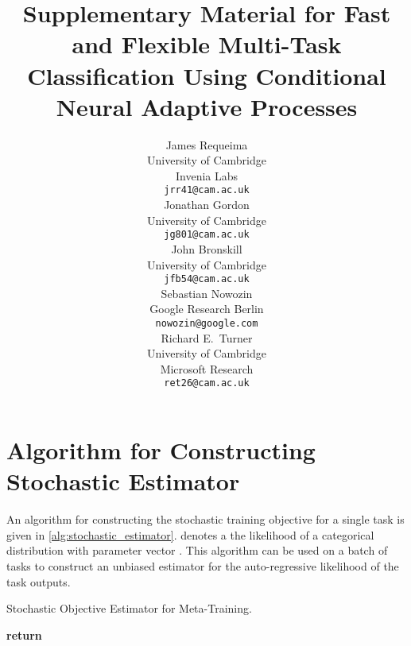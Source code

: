 \documentclass{article}
\theoremstyle{definition}
\begin{document}
\newpage
\appendix
\title{Supplementary Material for Fast and Flexible Multi-Task Classification Using Conditional Neural Adaptive Processes}
\author{
 James Requeima\footnotemark[1] \\
 University of Cambridge \\
 Invenia Labs \\
 \texttt{jrr41@cam.ac.uk} \\
 \And
 Jonathan Gordon\footnotemark[1] \\
 University of Cambridge \\
 \texttt{jg801@cam.ac.uk} \\
 \And
 John Bronskill\footnotemark[1] \\
 University of Cambridge \\
 \texttt{jfb54@cam.ac.uk} \\
 \And
 Sebastian Nowozin \\
 Google Research Berlin \\
 \texttt{nowozin@google.com}\\
 \And
 Richard E.~Turner \\
 University of Cambridge \\
 Microsoft Research \\
 \texttt{ret26@cam.ac.uk}
}




\section{Algorithm for Constructing Stochastic Estimator}
\label{app:stochastic_estimator}

An algorithm for constructing the stochastic training objective   for a single task  is given in \cref{alg:stochastic_estimator}.  denotes a the likelihood of a categorical distribution with parameter vector . This algorithm can be used on a batch of tasks to construct an unbiased estimator for the auto-regressive likelihood of the task outputs.


\begin{algorithm}[h]
\caption{Stochastic Objective Estimator for Meta-Training.}\label{alg:stochastic_estimator}
\begin{algorithmic}[1]
\State 
\State 
\For{\texttt{}}
    \State  
    \State  
\EndFor
\State \textbf{return} 
\EndProcedure
\end{algorithmic}
\end{algorithm}
\end{document}
